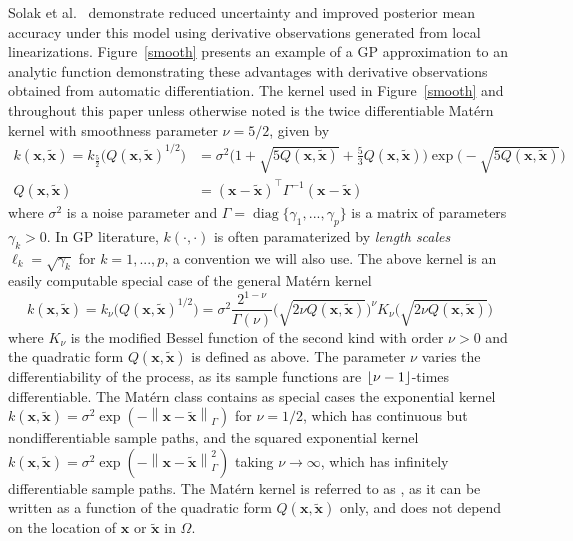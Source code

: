 \documentclass{article}
\newcommand{\norm}[1]{\left\lVert#1\right\rVert}
\renewcommand{\vec}[1]{\mathbf{#1}}
\DeclareMathOperator{\diag}{diag}
\DeclarePairedDelimiter\floor{\lfloor}{\rfloor}
\numberwithin{equation}{section}
\begin{document}
Solak et al.~\cite{solak2003derivative} demonstrate reduced uncertainty and improved posterior mean accuracy under this model using derivative observations generated from local linearizations. Figure~\ref{smooth} presents an example of a GP approximation to an analytic function demonstrating these advantages with derivative observations obtained from automatic differentiation. The kernel used in Figure~\ref{smooth} and throughout this paper unless otherwise noted is the twice differentiable Mat\'ern kernel with smoothness parameter $\nu = 5/2$, given by
\begin{align*}
  k(\vec{x}, \tilde{\vec{x}}) = k_{\frac{5}{2}}\Big(Q(\vec{x}, \tilde{\vec{x}})^{1/2}\Big) & = \sigma^2 \Big(1 + \sqrt{5Q(\vec{x}, \tilde{\vec{x}})} + \frac{5}{3}Q(\vec{x}, \tilde{\vec{x}}) \Big) \exp\Big( - \sqrt{5Q(\vec{x}, \tilde{\vec{x}})} \Big) \\
  Q(\vec{x}, \tilde{\vec{x}}) & = (\vec{x} - \tilde{\vec{x}})^\top \Gamma^{-1} (\vec{x} - \tilde{\vec{x}})
\end{align*}
where $\sigma^2$ is a noise parameter and $\Gamma = \diag\{\gamma_1,...,\gamma_p\}$ is a matrix of parameters $\gamma_k > 0$. In GP literature, $k(\cdot, \cdot)$ is often paramaterized by \textit{length scales} $\ell_k = \sqrt{\gamma_k}$ for $k=1,...,p$, a convention we will also use.
The above kernel is an easily computable special case of the general Mat\'ern kernel
$$ k(\vec{x}, \tilde{\vec{x}}) = k_\nu \Big(Q(\vec{x}, \tilde{\vec{x}})^{1/2}\Big) = \sigma^2 \frac{2^{1-\nu}}{\Gamma(\nu)} \Big(\sqrt{2\nu Q(\vec{x}, \tilde{\vec{x}})}\Big)^\nu K_\nu\Big(\sqrt{2\nu Q(\vec{x}, \tilde{\vec{x}})}\Big) $$
where $K_\nu$ is the modified Bessel function of the second kind with order $\nu > 0$ and the quadratic form $Q(\vec{x}, \tilde{\vec{x}})$ is defined as above. The parameter $\nu$ varies the differentiability of the process, as its sample functions are $\floor{\nu-1}$-times differentiable. The Mat\'ern class contains as special cases the exponential kernel
$k(\vec{x}, \tilde{\vec{x}}) = \sigma^2 \exp(-\norm{\vec{x} - \tilde{\vec{x}}}_\Gamma)$ for $\nu = 1/2$, which has continuous but nondifferentiable sample paths, and the squared exponential kernel $k(\vec{x}, \tilde{\vec{x}}) = \sigma^2 \exp(-\norm{\vec{x} - \tilde{\vec{x}}}_\Gamma^2)$
taking $\nu \to \infty$, which has infinitely differentiable sample paths. The Mat\'ern kernel is referred to as , as it can be written as a function of the quadratic form $Q(\vec{x}, \tilde{\vec{x}})$ only, and does not depend on the location of $\vec{x}$ or $\tilde{\vec{x}}$ in $\Omega$.
\end{document}
